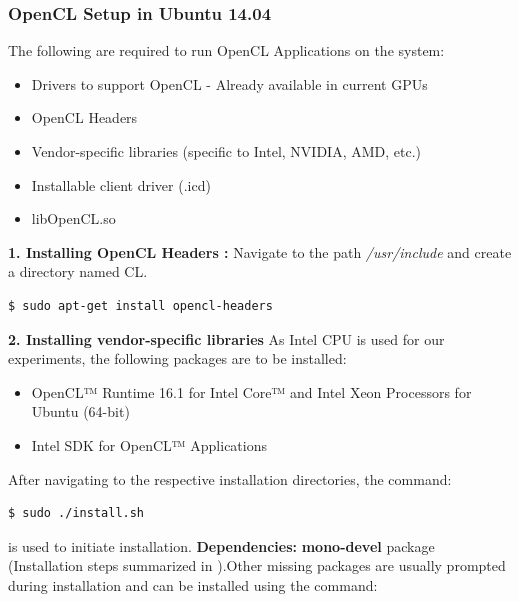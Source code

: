 \subsubsection*{OpenCL Setup in Ubuntu 14.04}
The following are required to run OpenCL Applications on the system: 
\begin{itemize}
\item Drivers to support OpenCL - Already available in current GPUs
\item OpenCL Headers
\item Vendor-specific libraries (specific to Intel, NVIDIA, AMD, etc.)
\item Installable client driver (.icd)
\item libOpenCL.so 
\end{itemize} \textbf{1. Installing OpenCL Headers \cite{opencl_headers}:} \newline
Navigate to the path \textit{/usr/include} and create a directory named CL.
\begin{scriptsize}
\linuxbash
\begin{lstlisting}
$ sudo apt-get install opencl-headers
\end{lstlisting}
\end{scriptsize}
\textbf{2. Installing vendor-specific libraries} \newline
As Intel CPU is used for our experiments, the following packages are to be installed:
\begin{itemize}
\item OpenCL™ Runtime 16.1 for Intel Core™ and Intel Xeon Processors for Ubuntu (64-bit) \cite{intel_runtime}
\item Intel SDK for OpenCL™ Applications \cite{intel_openclSDK}
\end{itemize}
After navigating to the respective installation directories, the command: 
\begin{scriptsize}
\linuxbash
\begin{lstlisting}
$ sudo ./install.sh
\end{lstlisting}
\end{scriptsize}
is used to initiate installation. \newline\newline
\textbf{Dependencies:}\newline \newline
\textbf{mono-devel} package (Installation steps summarized in \cite{mono-devel}).\newline Other missing packages are usually prompted during installation and can be installed using the command: 
